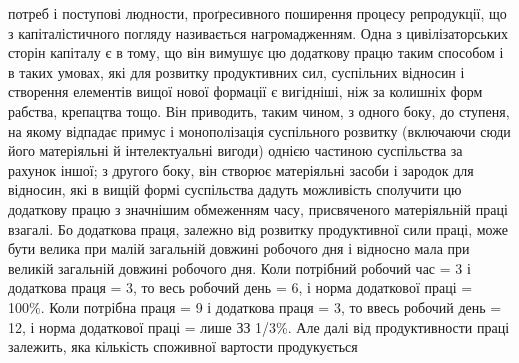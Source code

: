 потреб і поступові людности, проґресивного поширення процесу репродукції,
що з капіталістичного погляду називається нагромадженням. Одна з цивілізаторських
сторін капіталу є в тому, що він вимушує цю додаткову працю
таким способом і в таких умовах, які для розвитку продуктивних сил, суспільних
відносин і створення елементів вищої нової формації є вигідніші, ніж за колишніх
форм рабства, крепацтва тощо. Він приводить, таким чином, з одного боку, до
ступеня, на якому відпадає примус і монополізація суспільного розвитку (включаючи
сюди його матеріяльні й інтелектуальні вигоди) однією частиною суспільства
за рахунок іншої; з другого боку, він створює матеріяльні засоби
і зародок для відносин, які в вищій формі суспільства дадуть можливість сполучити
цю додаткову працю з значнішим обмеженням часу, присвяченого матеріяльній
праці взагалі. Бо додаткова праця, залежно від розвитку продуктивної
сили праці, може бути велика при малій загальній довжині робочого дня і відносно
мала при великій загальній довжині робочого дня. Коли потрібний робочий
час = 3 і додаткова праця = 3, то весь робочий день = 6, і норма додаткової
праці = 100\%. Коли потрібна праця = 9 і додаткова праця = 3, то ввесь
робочий день = 12, і норма додаткової праці = лише ЗЗ 1/3\%. Але далі від продуктивности
праці залежить, яка кількість споживної вартости продукується
\parbreak{}  %
